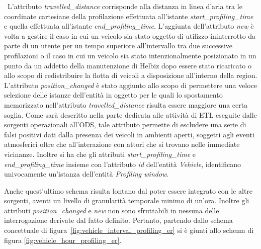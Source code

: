 \noindent~L'attributo \textit{travelled\_distance} corrisponde alla distanza in linea
d'aria tra le coordinate cartesiane della profilazione effettuata all'istante
\textit{start\_profiling\_time} e quella effettuata all'istante
\textit{end\_profiling\_time}.
L'aggiunta dell'attributo \textit{new} è volta a gestire il caso in cui un
veicolo sia stato oggetto di utilizzo ininterrotto da parte di un utente per
un tempo superiore all'intervallo tra due successive profilazioni o il caso in
cui un veicolo sia stato intenzionalmente posizionato in un punto da un addetto
della manutenzione di Helbiz dopo essere stato ricaricato o allo scopo di
redistribuire la flotta di veicoli a disposizione all'interno della region.
L'attributo \textit{position\_changed} è stato aggiunto allo scopo di permettere
una veloce selezione delle istanze dell'entità in oggetto per le quali lo
spostamento memorizzato nell'attributo \textit{travelled\_distance} risulta essere
maggiore una certa soglia. Come sarà descritto nella parte dedicata alle attività di
ETL eseguite dalle sorgenti operazionali all'ODS, tale attributo permette di
escludere una serie di falsi positivi dati dalla presenza dei veicoli in ambienti
aperti, soggetti agli eventi atmosferici oltre che all'interazione con attori
che si trovano nelle immediate vicinanze.
Inoltre si ha che gli attributi \textit{start\_profiling\_time} e
\textit{end\_profiling\_time} insieme con l'attributo \textit{id} dell'entità
\textit{Vehicle}, identificano univocamente un'istanza dell'entità
\textit{Profiling window}.

Anche quest'ultimo schema risulta lontano dal poter essere integrato con le altre
sorgenti, aventi un livello di granularità temporale minimo di un'ora.
Inoltre gli attributi \textit{position\_changed} e \textit{new} non sono
sfruttabili in nessuna delle interrogazione derivate dal fatto definito.
Pertanto, partendo dallo schema concettuale di
figura~\ref{fig:vehicle_interval_profiling_er} si è giunti allo schema di figura
\ref{fig:vehicle_hour_profiling_er}.

